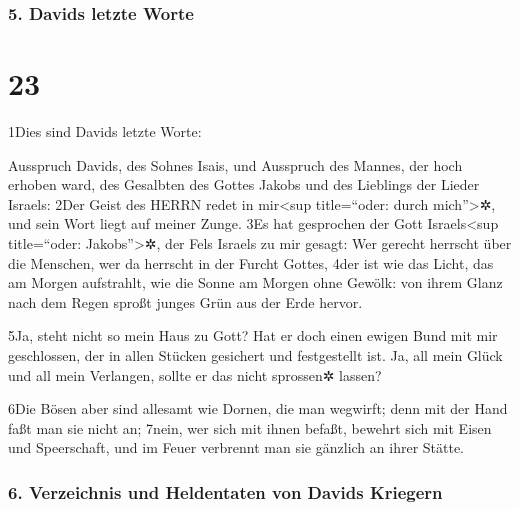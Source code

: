 \hypertarget{davids-letzte-worte}{%
\subsubsection{5. Davids letzte Worte}\label{davids-letzte-worte}}

\hypertarget{section-22}{%
\section{23}\label{section-22}}

1Dies sind Davids letzte Worte:

Ausspruch Davids, des Sohnes Isais, und Ausspruch des Mannes, der hoch
erhoben ward, des Gesalbten des Gottes Jakobs und des Lieblings der
Lieder Israels: 2Der Geist des HERRN redet in mir\textless sup
title=``oder: durch mich''\textgreater✲, und sein Wort liegt auf meiner
Zunge. 3Es hat gesprochen der Gott Israels\textless sup title=``oder:
Jakobs''\textgreater✲, der Fels Israels zu mir gesagt: Wer gerecht
herrscht über die Menschen, wer da herrscht in der Furcht Gottes, 4der
ist wie das Licht, das am Morgen aufstrahlt, wie die Sonne am Morgen
ohne Gewölk: von ihrem Glanz nach dem Regen sproßt junges Grün aus der
Erde hervor.

5Ja, steht nicht so mein Haus zu Gott? Hat er doch einen ewigen Bund mit
mir geschlossen, der in allen Stücken gesichert und festgestellt ist.
Ja, all mein Glück und all mein Verlangen, sollte er das nicht sprossen✲
lassen?

6Die Bösen aber sind allesamt wie Dornen, die man wegwirft; denn mit der
Hand faßt man sie nicht an; 7nein, wer sich mit ihnen befaßt, bewehrt
sich mit Eisen und Speerschaft, und im Feuer verbrennt man sie gänzlich
an ihrer Stätte.

\hypertarget{verzeichnis-und-heldentaten-von-davids-kriegern}{%
\subsubsection{6. Verzeichnis und Heldentaten von Davids
Kriegern}\label{verzeichnis-und-heldentaten-von-davids-kriegern}}

